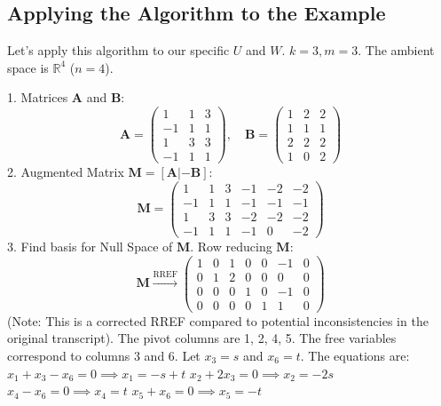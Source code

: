 \documentclass[11pt]{article}
\theoremstyle{definition}
\theoremstyle{remark}
\newcommand{\R}{\mathbb{R}}
\newcommand{\matA}{\mathbf{A}}
\newcommand{\matB}{\mathbf{B}}
\begin{document}
\subsection{Applying the Algorithm to the Example}

Let's apply this algorithm to our specific $U$ and $W$.
$k=3, m=3$. The ambient space is $\R^4$ ($n=4$).

1.  Matrices $\matA$ and $\matB$:
    \[ \matA = \begin{pmatrix} 1 & 1 & 3 \\ -1 & 1 & 1 \\ 1 & 3 & 3 \\ -1 & 1 & 1 \end{pmatrix}, \quad \matB = \begin{pmatrix} 1 & 2 & 2 \\ 1 & 1 & 1 \\ 2 & 2 & 2 \\ 1 & 0 & 2 \end{pmatrix} \]
2.  Augmented Matrix $\mathbf{M} = [\matA | -\matB]$:
    \[ \mathbf{M} = \left( \begin{array}{ccc|ccc} 1 & 1 & 3 & -1 & -2 & -2 \\ -1 & 1 & 1 & -1 & -1 & -1 \\ 1 & 3 & 3 & -2 & -2 & -2 \\ -1 & 1 & 1 & -1 & 0 & -2 \end{array} \right) \]
3.  Find basis for Null Space of $\mathbf{M}$. Row reducing $\mathbf{M}$:
    \[ \mathbf{M} \xrightarrow{\text{RREF}} \left( \begin{array}{cccccc|c} 1 & 0 & 1 & 0 & 0 & -1 & 0 \\ 0 & 1 & 2 & 0 & 0 & 0 & 0 \\ 0 & 0 & 0 & 1 & 0 & -1 & 0 \\ 0 & 0 & 0 & 0 & 1 & 1 & 0 \end{array} \right) \]
    (Note: This is a corrected RREF compared to potential inconsistencies in the original transcript).
    The pivot columns are 1, 2, 4, 5. The free variables correspond to columns 3 and 6. Let $x_3 = s$ and $x_6 = t$.
    The equations are:
    $x_1 + x_3 - x_6 = 0 \implies x_1 = -s + t$
    $x_2 + 2x_3 = 0 \implies x_2 = -2s$
    $x_4 - x_6 = 0 \implies x_4 = t$
    $x_5 + x_6 = 0 \implies x_5 = -t$
\end{document}
